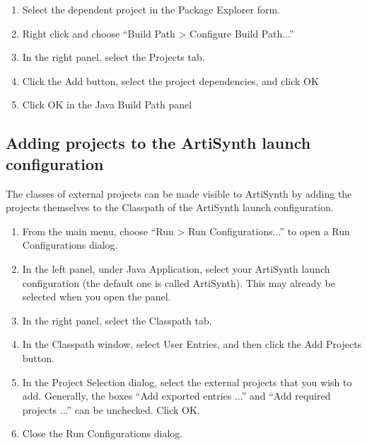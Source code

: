 \begin{enumerate}

\item Select the dependent project in the {\sf Package Explorer} form.

\item Right click and choose ``{\sf Build Path > Configure Build Path...}''

\item In the right panel, select the {\sf Projects} tab.

\item Click the {\sf Add} button, select the project dependencies,
      and click {\sf OK}

\item Click {\sf OK} in the Java Build Path panel

\end{enumerate}

\subsection{Adding projects to the ArtiSynth launch configuration}
\label{AddingProjectsToLaunch}

The classes of external projects can be made visible to ArtiSynth by
adding the projects themselves to the Classpath of the ArtiSynth launch
configuration.

\begin{enumerate}

\item From the main menu, choose ``{\sf Run > Run Configurations...}''
to open a {\sf Run Configurations} dialog.

\item In the left panel, under {\sf Java Application}, select your
ArtiSynth launch configuration (the default one is called {\sf
ArtiSynth}). This may already be selected when you open the panel.

\item In the right panel, select the {\sf Classpath} tab.

\item In the {\sf Classpath} window, select {\sf User Entries},
and then click the {\sf Add Projects} button.

\item In the {\sf Project Selection} dialog, select the external
projects that you wish to add. Generally, the boxes
``{\sf Add exported entries ...}'' and ``{\sf Add required projects ...}''
can be unchecked. Click {\sf OK}.

\item Close the {\sf Run Configurations} dialog.

\end{enumerate}

